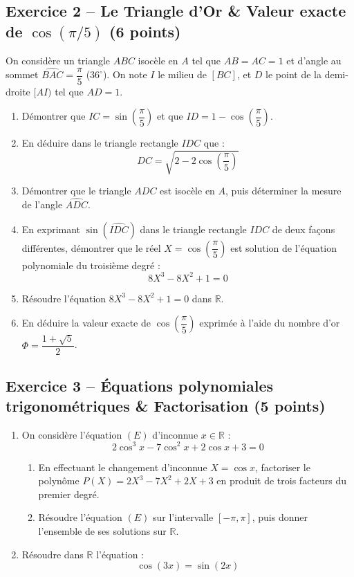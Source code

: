 \documentclass[11pt,a4paper]{article}
\newcommand{\R}{\mathbb{R}}
\begin{document}
\subsection*{Exercice 2 -- Le Triangle d'Or \& Valeur exacte de $\cos(\pi/5)$ \hfill (6 points)}

On considère un triangle $ABC$ isocèle en $A$ tel que $AB = AC = 1$ et d'angle au sommet $\widehat{BAC} = \dfrac{\pi}{5}$ ($36^\circ$).
On note $I$ le milieu de $[BC]$, et $D$ le point de la demi-droite $[AI)$ tel que $AD = 1$.

\begin{enumerate}
    \item Démontrer que $IC = \sin\left(\dfrac{\pi}{5}\right)$ et que $ID = 1 - \cos\left(\dfrac{\pi}{5}\right)$.
    \item En déduire dans le triangle rectangle $IDC$ que :
    \[
    DC = \sqrt{2 - 2\cos\left(\dfrac{\pi}{5}\right)}
    \]
    \item Démontrer que le triangle $ADC$ est isocèle en $A$, puis déterminer la mesure de l'angle $\widehat{ADC}$.
    \item En exprimant $\sin(\widehat{IDC})$ dans le triangle rectangle $IDC$ de deux façons différentes, démontrer que le réel $X = \cos\left(\dfrac{\pi}{5}\right)$ est solution de l'équation polynomiale du troisième degré :
    \[
    8X^3 - 8X^2 + 1 = 0
    \]
    \item Résoudre l'équation $8X^3 - 8X^2 + 1 = 0$ dans $\R$.
    \item En déduire la valeur exacte de $\cos\left(\dfrac{\pi}{5}\right)$ exprimée à l'aide du nombre d'or $\Phi = \dfrac{1+\sqrt{5}}{2}$.
\end{enumerate}

\vspace{0.3cm}

\subsection*{Exercice 3 -- Équations polynomiales trigonométriques \& Factorisation \hfill (5 points)}

\begin{enumerate}
    \item On considère l'équation $(E)$ d'inconnue $x \in \R$ :
    \[
    2\cos^3 x - 7\cos^2 x + 2\cos x + 3 = 0
    \]
    \begin{enumerate}
        \item En effectuant le changement d'inconnue $X = \cos x$, factoriser le polynôme $P(X) = 2X^3 - 7X^2 + 2X + 3$ en produit de trois facteurs du premier degré.
        \item Résoudre l'équation $(E)$ sur l'intervalle $[-\pi, \pi]$, puis donner l'ensemble de ses solutions sur $\R$.
    \end{enumerate}
    \item Résoudre dans $\R$ l'équation :
    \[
    \cos(3x) = \sin(2x)
    \]
\end{enumerate}
\end{document}
